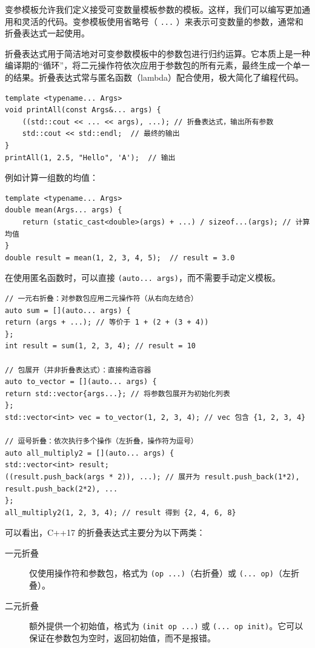 变参模板允许我们定义接受可变数量模板参数的模板。这样，我们可以编写更加通用和灵活的代码。变参模板使用省略号（ \verb|...| ）来表示可变数量的参数，通常和折叠表达式一起使用。

折叠表达式用于简洁地对可变参数模板中的参数包进行归约运算。它本质上是一种编译期的“循环”，将二元操作符依次应用于参数包的所有元素，最终生成一个单一的结果。折叠表达式常与匿名函数（lambda）配合使用，极大简化了编程代码。

\begin{verbatim}
template <typename... Args>
void printAll(const Args&... args) {
    ((std::cout << ... << args), ...); // 折叠表达式，输出所有参数
    std::cout << std::endl;  // 最终的输出
}
printAll(1, 2.5, "Hello", 'A');  // 输出
\end{verbatim}

例如计算一组数的均值：
\begin{verbatim}
template <typename... Args>
double mean(Args... args) {
    return (static_cast<double>(args) + ...) / sizeof...(args); // 计算均值
}
double result = mean(1, 2, 3, 4, 5);  // result = 3.0
\end{verbatim}

在使用匿名函数时，可以直接 \verb|(auto... args)|，而不需要手动定义模板。
\begin{verbatim}
// 一元右折叠：对参数包应用二元操作符（从右向左结合）
auto sum = [](auto... args) {
return (args + ...); // 等价于 1 + (2 + (3 + 4))
};
int result = sum(1, 2, 3, 4); // result = 10

// 包展开（并非折叠表达式）：直接构造容器
auto to_vector = [](auto... args) {
return std::vector{args...}; // 将参数包展开为初始化列表
};
std::vector<int> vec = to_vector(1, 2, 3, 4); // vec 包含 {1, 2, 3, 4}

// 逗号折叠：依次执行多个操作（左折叠，操作符为逗号）
auto all_multiply2 = [](auto... args) {
std::vector<int> result;
((result.push_back(args * 2)), ...); // 展开为 result.push_back(1*2), result.push_back(2*2), ...
};
all_multiply2(1, 2, 3, 4); // result 得到 {2, 4, 6, 8}
\end{verbatim}

可以看出，C++17 的折叠表达式主要分为以下两类：
\begin{description}
\item[一元折叠] 仅使用操作符和参数包，格式为 \verb|(op ...)|（右折叠）或 \verb|(... op)|（左折叠）。
\item[二元折叠] 额外提供一个初始值，格式为 \verb|(init op ...)| 或 \verb|(... op init)|。它可以保证在参数包为空时，返回初始值，而不是报错。
\end{description}

